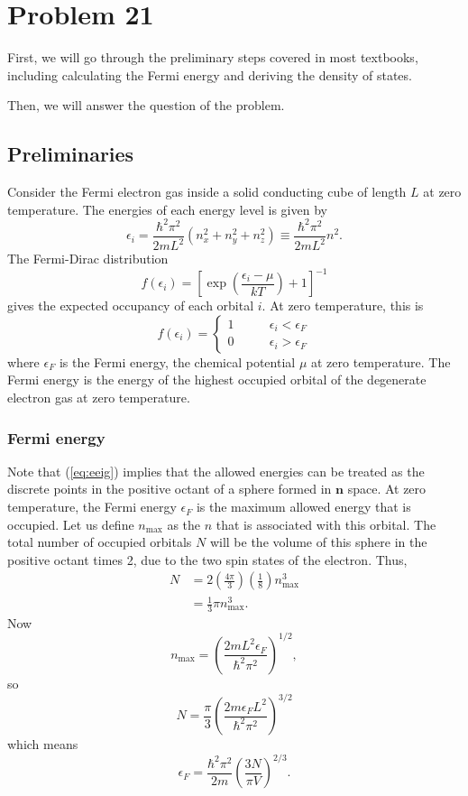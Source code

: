 \documentclass[12pt]{article}
\title{}
\date{}
\author{Jacob H. Nie}
\begin{document}
\section*{Problem 21}

First, we will go through the preliminary steps covered in most textbooks, including calculating the Fermi energy and deriving the density of states.

Then, we will answer the question of the problem.

\subsection*{Preliminaries}
Consider the Fermi electron gas inside a solid conducting cube of length $L$ at zero temperature.  The energies of each energy level is given by 
\begin{equation} \label{eq:eeig} 
	\epsilon_i = \frac{\hbar^2 \pi^2}{2 m L^2}(n_x^2 + n_y^2 + n_z^2) \equiv \frac{\hbar^2 \pi^2}{2 m L^2}n^2. 
\end{equation}
The Fermi-Dirac distribution
\begin{equation}
	f(\epsilon_i) = \left[ \exp\left( \frac{\epsilon_i - \mu}{kT} \right) + 1 \right]^{-1} 
\end{equation}
gives the expected occupancy of each orbital $i$. At zero temperature, this is
 \[
	 f(\epsilon_i) = \begin{cases} 1 & \qquad \epsilon_i < \epsilon_F \\ 0 & \qquad \epsilon_i > \epsilon_F \end{cases}
\]
where $\epsilon_F$ is the Fermi energy, the chemical potential $\mu$ at zero temperature.  The Fermi energy is the energy of the highest occupied orbital of the degenerate electron gas at zero temperature.  

\subsubsection*{Fermi energy}
Note that (\ref{eq:eeig}) implies that the allowed energies can be treated as the discrete points in the positive octant of a sphere formed in $\mathbf{n}$ space.  At zero temperature, the Fermi energy $\epsilon_F$ is the maximum allowed energy that is occupied.  Let us define $n_{\text{max}}$ as the $n$ that is associated with this orbital.  The total number of occupied orbitals $N$ will be the volume of this sphere in the positive octant times 2, due to the two spin states of the electron.  Thus,
\begin{align}
	N &= 2\left( \frac{4\pi}{3} \right)\left( \frac{1}{8} \right) n_{\text{max}}^{3} \nonumber \\
	  &= \frac{1}{3}\pi n_{\text{max}}^3.
\end{align}
Now 
\[
	n_{\text{max}} = \left( \frac{2 m L^2 \epsilon_F}{\hbar^2 \pi^2} \right)^{1/2},
\]
so 
\[
	N = \frac{\pi}{3}\left( \frac{2m \epsilon_F L^2}{\hbar^2 \pi^2} \right)^{3/2}
\]
which means
\begin{equation}
	\epsilon_F = \frac{\hbar^2 \pi^2}{2 m}\left( \frac{3N}{\pi V} \right)^{2/3}.
\end{equation}
\end{document}
